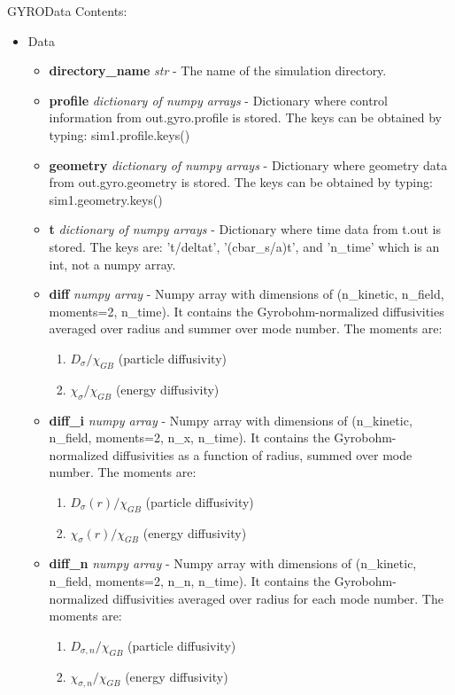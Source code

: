 \documentclass{article}
\begin{document}
\newpage
GYROData Contents:
\begin{itemize}
\item Data
\begin{itemize}
\item \textbf{directory\_name}\emph{ str} - The name of the simulation directory.
\item \textbf{profile}\emph{ dictionary of numpy arrays} - Dictionary where control information from out.gyro.profile is stored.  The keys can be obtained by typing: sim1.profile.keys()
\item \textbf{geometry}\emph{ dictionary of numpy arrays} - Dictionary where geometry data from out.gyro.geometry is stored.  The keys can be obtained by typing: sim1.geometry.keys()
\item \textbf{t}\emph{ dictionary of numpy arrays} - Dictionary where time data from t.out is stored.  The keys are: 't/deltat', '(cbar\_s/a)t', and 'n\_time' which is an int, not a numpy array.
\item \textbf{diff}\emph{ numpy array} - Numpy array with dimensions of (n\_kinetic, n\_field, moments=2, n\_time).  It contains the Gyrobohm-normalized diffusivities averaged over radius and summer over mode number.  The moments are:
\begin{enumerate}
\item $D_\sigma/\chi_{GB}$ (particle diffusivity)
\item $\chi_\sigma/\chi_{GB}$ (energy diffusivity)
\end{enumerate}
\item \textbf{diff\_i}\emph{ numpy array} - Numpy array with dimensions of (n\_kinetic, n\_field, moments=2, n\_x, n\_time).  It contains the Gyrobohm-normalized diffusivities as a function of radius, summed over mode number.  The moments are:
\begin{enumerate}
\item $D_\sigma(r)/\chi_{GB}$ (particle diffusivity)
\item $\chi_\sigma(r)/\chi_{GB}$ (energy diffusivity)
\end{enumerate}
\item \textbf{diff\_n}\emph{ numpy array} - Numpy array with dimensions of (n\_kinetic, n\_field, moments=2, n\_n, n\_time).  It contains the Gyrobohm-normalized diffusivities averaged over radius for each mode number.  The moments are:
\begin{enumerate}
\item $D_{\sigma,n}/\chi_{GB}$ (particle diffusivity)
\item $\chi_{\sigma,n}/\chi_{GB}$ (energy diffusivity)

\end{enumerate}
\end{itemize}
\end{itemize}
\end{document}
